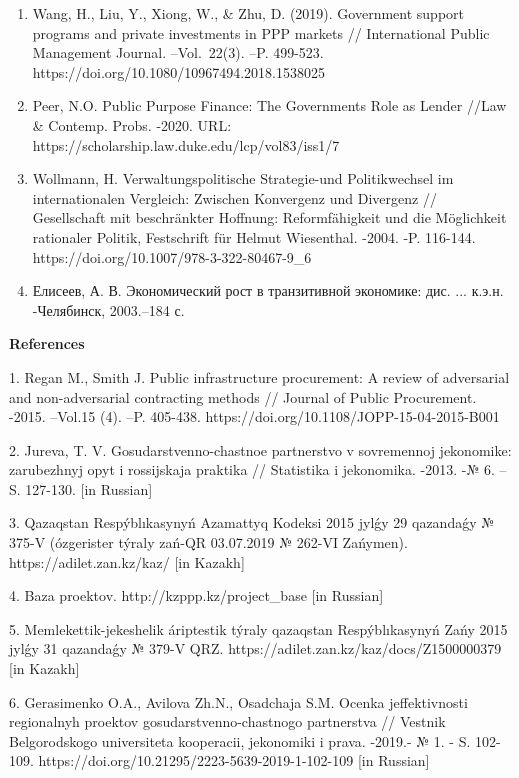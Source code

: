 \begin{enumerate}
  governments support the development of public private partnerships?
  Measuring and comparing PPP governmental support in 20 European
  countries // Transport Reviews. -2015. --Vol. 35(2). --P. 118-139.
  DOI:10.1080/01441647.2014.993746
\item
  Wang, H., Liu, Y., Xiong, W., \& Zhu, D. (2019). Government support
  programs and private investments in PPP markets // International
  Public Management Journal. --Vol.~22(3). --P. 499-523.
  https://doi.org/10.1080/10967494.2018.1538025
\item
  Peer, N.O. Public Purpose Finance: The Government\textquotesingle s
  Role as Lender //Law \& Contemp. Probs. -2020. URL:
  https://scholarship.law.duke.edu/lcp/vol83/iss1/7
\item
  Wollmann, H. Verwaltungspolitische Strategie-und Politikwechsel im
  internationalen Vergleich: Zwischen Konvergenz und Divergenz //
  Gesellschaft mit beschränkter Hoffnung: Reformfähigkeit und die
  Möglichkeit rationaler Politik, Festschrift für Helmut Wiesenthal.
  -2004. -P. 116-144. https://doi.org/10.1007/978-3-322-80467-9\_6
\item
  Елисеев, А. В. Экономический рост в транзитивной экономике: дис. ...
  к.э.н.\\
  -Челябинск, 2003.--184 с.
\end{enumerate}

{\bfseries References}

1. Regan M., Smith J. Public infrastructure procurement: A review of
adversarial and non-adversarial contracting methods // Journal of Public
Procurement. -2015. --Vol.15 (4). --P. 405-438.
https://doi.org/10.1108/JOPP-15-04-2015-B001

2. Jur\textquotesingle eva, T. V. Gosudarstvenno-chastnoe partnerstvo v
sovremennoj jekonomike: zarubezhnyj opyt i rossijskaja praktika //
Statistika i jekonomika. -2013. -№ 6. --S. 127-130. {[}in Russian{]}

3. Qazaqstan Respýblıkasynyń Azamattyq Kodeksi 2015 jylǵy 29 qazandaǵy №
375-V (ózgerister týraly zań-QR 03.07.2019 № 262-VI Zańymen).
https://adilet.zan.kz/kaz/ {[}in Kazakh{]}

4. Baza proektov. http://kzppp.kz/project\_base {[}in Russian{]}

5. Memlekettik-jekeshelik áriptestik týraly qazaqstan Respýblıkasynyń
Zańy 2015 jylǵy 31 qazandaǵy № 379-V QRZ.
https://adilet.zan.kz/kaz/docs/Z1500000379 {[}in Kazakh{]}

6. Gerasimenko O.A., Avilova Zh.N., Osadchaja S.M. Ocenka jeffektivnosti
regional\textquotesingle nyh proektov gosudarstvenno-chastnogo
partnerstva // Vestnik Belgorodskogo universiteta kooperacii, jekonomiki
i prava. -2019.- № 1. - S. 102-109.
https://doi.org/10.21295/2223-5639-2019-1-102-109 {[}in Russian{]}

